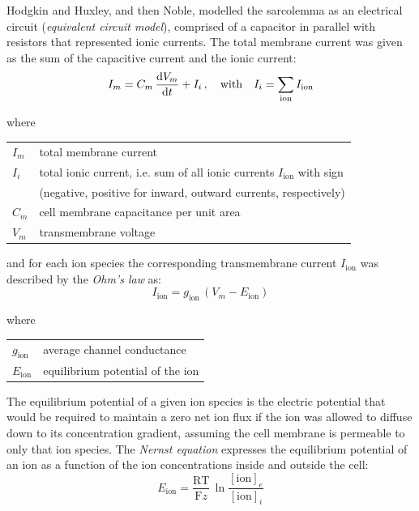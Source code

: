 \vspace{0.2cm}
Hodgkin and Huxley, and then Noble, modelled the sarcolemma as an electrical circuit (\textit{equivalent circuit model}), comprised of a capacitor in parallel with resistors that represented ionic currents. The total membrane current was given as the sum of the capacitive current and the ionic current:
%
\begin{equation}\label{eq:membranecurrent}
I_m = C_m\,\dfrac{\mathrm{d}{V_m}}{\mathrm{d}{t}} + I_i\,,\quad\text{with}\quad I_i = \sum_{\textrm{ion}}I_\textrm{ion}
\end{equation}

\noindent
where

\vspace{0.2cm}
\begin{tabular}{ll}
    $I_m$            & total membrane current \\
    $I_i$            & total ionic current, i.e. sum of all ionic currents $I_\textrm{ion}$ with sign \\
    & (negative, positive for inward, outward currents, respectively) \\ 
    $C_m$            & cell membrane capacitance per unit area \\
    $V_m$            & transmembrane voltage
\end{tabular}

\vspace{0.2cm}\noindent
and for each ion species the corresponding transmembrane current $I_{\textrm{ion}}$ was described by the \textit{Ohm's law} as:
%
\begin{equation}\label{eq:ohmslawsinglechannel}
    I_{\textrm{ion}} = g_{\textrm{ion}}\,(V_m-E_{\textrm{ion}})
\end{equation}

\noindent
where

\vspace{0.2cm}
\begin{tabular}{ll}
    $g_{\textrm{ion}}$ & average channel conductance \\
    $E_\textrm{ion}$ & equilibrium potential of the ion
\end{tabular}

\vspace{0.2cm}\noindent
The equilibrium potential of a given ion species is the electric potential that would be required to maintain a zero net ion flux if the ion was allowed to diffuse down to its concentration gradient, assuming the cell membrane is permeable to only that ion species. The \textit{Nernst equation} expresses the equilibrium potential of an ion as a function of the ion concentrations inside and outside the cell:
%
\begin{equation}
    E_{\textrm{ion}}=\frac{\textrm{R}\textrm{T}}{\textrm{F}z}\,\ln{\frac{[\textrm{ion}]_{e}}{[\textrm{ion}]_{i}}}
\end{equation}

